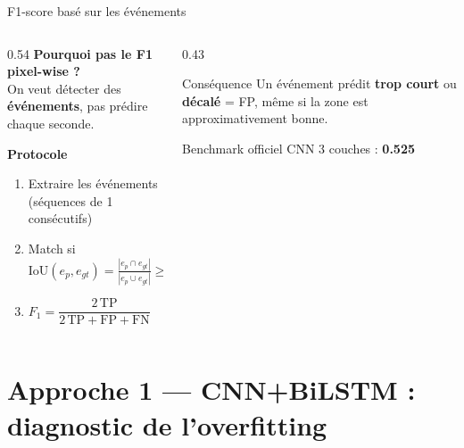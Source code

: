 \documentclass[aspectratio=169, 10pt]{beamer}
\begin{document}
\begin{frame}{F1-score basé sur les événements}
    \begin{columns}[T]
        \begin{column}{0.54\textwidth}
            \small\textbf{Pourquoi pas le F1 pixel-wise ?}\\[2pt]
            On veut détecter des \textbf{événements}, pas prédire chaque seconde.

            \vspace{0.25cm}
            \textbf{Protocole}
            \begin{enumerate}\setlength\itemsep{1pt}\small
                \item Extraire les événements (séquences de 1 consécutifs)
                \item Match si $\displaystyle\text{IoU}(e_p, e_{gt}) =
                      \frac{|e_p \cap e_{gt}|}{|e_p \cup e_{gt}|} \geq 0.3$
                \item $F_1 = \dfrac{2\,\text{TP}}{2\,\text{TP} + \text{FP} + \text{FN}}$
            \end{enumerate}
        \end{column}
        \begin{column}{0.43\textwidth}
            \begin{block}{\small Conséquence}
                \small Un événement prédit \textbf{trop court} ou \textbf{décalé} = FP,
                même si la zone est approximativement bonne.
            \end{block}
            \vspace{0.2cm}
            \begin{alertblock}{\small Benchmark officiel}
                \centering\small CNN 3 couches : \textbf{0.525}
            \end{alertblock}
        \end{column}
    \end{columns}
\end{frame}


\section{Approche 1 — CNN+BiLSTM : diagnostic de l'overfitting}
\end{document}
